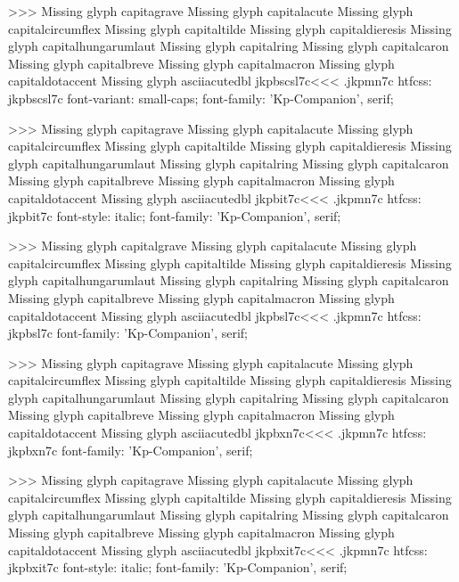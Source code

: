 >>>
Missing glyph	capitagrave
Missing glyph	capitalacute
Missing glyph	capitalcircumflex
Missing glyph	capitaltilde
Missing glyph	capitaldieresis
Missing glyph	capitalhungarumlaut
Missing glyph	capitalring
Missing glyph	capitalcaron
Missing glyph	capitalbreve
Missing glyph	capitalmacron
Missing glyph	capitaldotaccent
Missing glyph	asciiacutedbl
\<jkpbscsl7c\><<<
.jkpmn7c
htfcss:  jkpbscsl7c  font-variant: small-caps; font-family: 'Kp-Companion', serif;

>>>
Missing glyph	capitagrave
Missing glyph	capitalacute
Missing glyph	capitalcircumflex
Missing glyph	capitaltilde
Missing glyph	capitaldieresis
Missing glyph	capitalhungarumlaut
Missing glyph	capitalring
Missing glyph	capitalcaron
Missing glyph	capitalbreve
Missing glyph	capitalmacron
Missing glyph	capitaldotaccent
Missing glyph	asciiacutedbl
\<jkpbit7c\><<<
.jkpmn7c
htfcss:  jkpbit7c  font-style: italic; font-family: 'Kp-Companion', serif;

>>>
Missing glyph	capitalgrave
Missing glyph	capitalacute
Missing glyph	capitalcircumflex
Missing glyph	capitaltilde
Missing glyph	capitaldieresis
Missing glyph	capitalhungarumlaut
Missing glyph	capitalring
Missing glyph	capitalcaron
Missing glyph	capitalbreve
Missing glyph	capitalmacron
Missing glyph	capitaldotaccent
Missing glyph	asciiacutedbl
\<jkpbsl7c\><<<
.jkpmn7c
htfcss:  jkpbsl7c  font-family: 'Kp-Companion', serif;

>>>
Missing glyph	capitagrave
Missing glyph	capitalacute
Missing glyph	capitalcircumflex
Missing glyph	capitaltilde
Missing glyph	capitaldieresis
Missing glyph	capitalhungarumlaut
Missing glyph	capitalring
Missing glyph	capitalcaron
Missing glyph	capitalbreve
Missing glyph	capitalmacron
Missing glyph	capitaldotaccent
Missing glyph	asciiacutedbl
\<jkpbxn7c\><<<
.jkpmn7c
htfcss:  jkpbxn7c  font-family: 'Kp-Companion', serif;

>>>
Missing glyph	capitagrave
Missing glyph	capitalacute
Missing glyph	capitalcircumflex
Missing glyph	capitaltilde
Missing glyph	capitaldieresis
Missing glyph	capitalhungarumlaut
Missing glyph	capitalring
Missing glyph	capitalcaron
Missing glyph	capitalbreve
Missing glyph	capitalmacron
Missing glyph	capitaldotaccent
Missing glyph	asciiacutedbl
\<jkpbxit7c\><<<
.jkpmn7c
htfcss:  jkpbxit7c  font-style: italic; font-family: 'Kp-Companion', serif;


